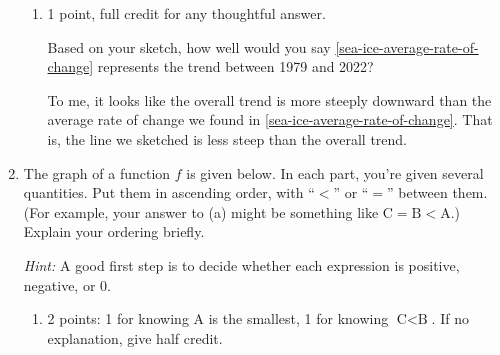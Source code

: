 \documentclass{article}
\newenvironment{enumeratecols}[2][]
{\NumTabs{#2}%
  \begin{enumerate*}[%
    itemjoin={\tab},#1]}%
  {\end{enumerate*}}
\begin{document}
\begin{enumerate}
\begin{enumerate}
  \item

    \begin{grading}
      1 point, full credit for any thoughtful answer. 
    \end{grading}

    \begin{problem}[\vfill\newpage]
      Based on your sketch, how well would you say \ref{sea-ice-average-rate-of-change} represents the trend between 1979 and 2022?
    \end{problem}

    \begin{solution}
      To me, it looks like the overall trend is more steeply downward than the average rate of change we found in \ref{sea-ice-average-rate-of-change}. That is, the line we sketched is less steep than the overall trend.
    \end{solution}

  \end{enumerate}

\item %
  \label{probFG-18}

  The graph of a function $f$ is given below. In each part, you're given several quantities. Put them in ascending order, with ``$<$'' or ``$=$'' between them. (For example, your answer to (a) might be something like $\text{C} = \text{B} < \text{A}$.) Explain your ordering briefly.

  \emph{Hint:} A good first step is to decide whether each expression is positive, negative, or 0.

  \begin{enumerate}

  \item

    \begin{grading}
      2 points: 1 for knowing A is the smallest, 1 for knowing
      $\text{C} < \text{B}$. If no explanation, give half credit. 
    \end{grading}

\end{enumerate}
\end{enumerate}
\end{document}

